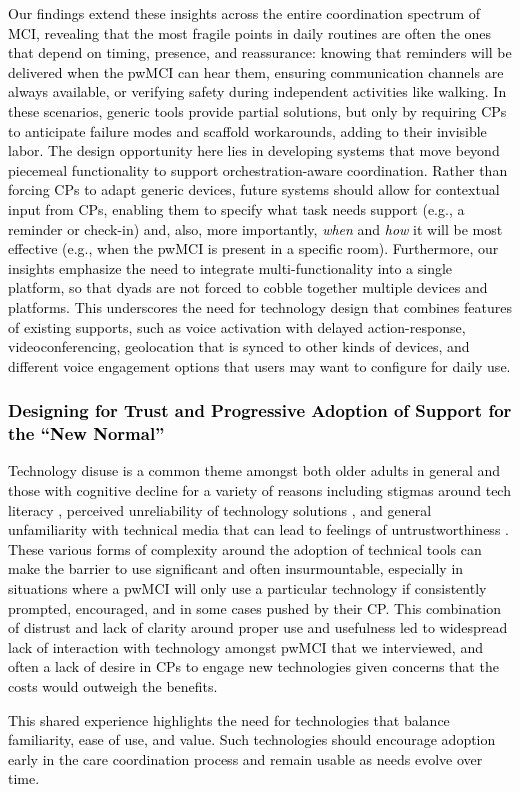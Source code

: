 \documentclass[acmsmall]{acmart}
\begin{document}
\textcolor{black}{Our findings extend these insights across the entire coordination spectrum of MCI, revealing that the most fragile points in daily routines are often the ones that depend on timing, presence, and reassurance: knowing that reminders will be delivered when the pwMCI can hear them, ensuring communication channels are always available, or verifying safety during independent activities like walking. In these scenarios, generic tools provide partial solutions, but only by requiring CPs to anticipate failure modes and scaffold workarounds, adding to their invisible labor. The design opportunity here lies in developing systems that move beyond piecemeal functionality to support orchestration-aware coordination. Rather than forcing CPs to adapt generic devices, future systems should allow for contextual input from CPs, enabling them to specify what task needs support (e.g., a reminder or check-in) and, also, more importantly, \textit{when} and \textit{how} it will be most effective (e.g., when the pwMCI is present in a specific room). Furthermore, \textcolor{black}{our insights emphasize} the need to integrate multi-functionality into a single platform, so that dyads are not forced to cobble together multiple devices and platforms. This underscores the need for technology design that combines features of existing supports, such as voice activation with delayed action-response, videoconferencing, geolocation that is synced to other kinds of devices, and different voice engagement options that users may want to configure for daily use.}

\textcolor{black}{\subsubsection{Designing for Trust and Progressive Adoption of Support for the “New Normal”}
Technology disuse is a common theme amongst both older adults in general and those with cognitive decline for a variety of reasons including stigmas around tech literacy \cite{guisado2019factors}, perceived unreliability of technology solutions \cite{pradhan2020use}, and general unfamiliarity with technical media that can lead to feelings of untrustworthiness \cite{knowles2018older}. These various forms of complexity around the adoption of technical tools can make the barrier to use significant and often insurmountable, especially in situations where a pwMCI will only use a particular technology if consistently prompted, encouraged, and in some cases pushed by their CP. This combination of distrust and lack of clarity around proper use and usefulness led to widespread lack of interaction with technology amongst pwMCI that we interviewed, and often a lack of desire in CPs to engage new technologies given concerns that the costs would outweigh the benefits.} \textcolor{black}{This shared experience highlights the need for technologies that balance familiarity, ease of use, and value. Such technologies should encourage adoption early in the care coordination process and remain usable as needs evolve over time.}
\end{document}
